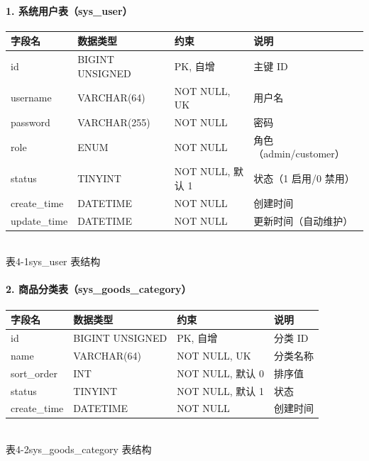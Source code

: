 \paragraph{1. 系统用户表（sys\_user）}
\begin{center}
  \renewcommand{\arraystretch}{1.4}
  \begin{tabular}{|>{\centering\arraybackslash}m{2.5cm}|>{\centering\arraybackslash}m{3.2cm}|>{\centering\arraybackslash}m{4.4cm}|>{\centering\arraybackslash}m{3.5cm}|}
    \hline
    \textbf{字段名} & \textbf{数据类型}   & \textbf{约束}    & \textbf{说明}        \\ \hline
    id           & BIGINT UNSIGNED & PK, 自增         & 主键 ID              \\ \hline
    username     & VARCHAR(64)     & NOT NULL, UK   & 用户名                \\ \hline
    password     & VARCHAR(255)    & NOT NULL       & 密码                 \\ \hline
    role         & ENUM            & NOT NULL       & 角色（admin/customer） \\ \hline
    status       & TINYINT         & NOT NULL, 默认 1 & 状态（1 启用/0 禁用）      \\ \hline
    create\_time & DATETIME        & NOT NULL       & 创建时间               \\ \hline
    update\_time & DATETIME        & NOT NULL       & 更新时间（自动维护）         \\ \hline
  \end{tabular}
  \\[0.3em]
  {表4-1\quad sys\_user 表结构}
\end{center}

\paragraph{2. 商品分类表（sys\_goods\_category）}
\begin{center}
  \renewcommand{\arraystretch}{1.4}
  \begin{tabular}{|>{\centering\arraybackslash}m{2.5cm}|>{\centering\arraybackslash}m{3.2cm}|>{\centering\arraybackslash}m{4.4cm}|>{\centering\arraybackslash}m{3.5cm}|}
    \hline
    \textbf{字段名} & \textbf{数据类型}   & \textbf{约束}    & \textbf{说明} \\ \hline
    id           & BIGINT UNSIGNED & PK, 自增         & 分类 ID       \\ \hline
    name         & VARCHAR(64)     & NOT NULL, UK   & 分类名称        \\ \hline
    sort\_order  & INT             & NOT NULL, 默认 0 & 排序值         \\ \hline
    status       & TINYINT         & NOT NULL, 默认 1 & 状态          \\ \hline
    create\_time & DATETIME        & NOT NULL       & 创建时间        \\ \hline
  \end{tabular}
  \\[0.3em]
  {表4-2\quad sys\_goods\_category 表结构}
\end{center}

